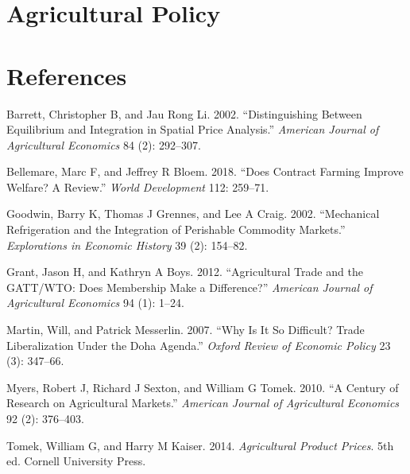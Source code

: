 \documentclass[
]{book}
\begin{document}
\hypertarget{agricultural-policy}{%
\chapter{Agricultural Policy}\label{agricultural-policy}}

\hypertarget{references}{%
\chapter*{References}\label{references}}

\hypertarget{refs}{}
\leavevmode\hypertarget{ref-barrett2002}{}%
Barrett, Christopher B, and Jau Rong Li. 2002. ``Distinguishing Between Equilibrium and Integration in Spatial Price Analysis.'' \emph{American Journal of Agricultural Economics} 84 (2): 292--307.

\leavevmode\hypertarget{ref-bellemare2018}{}%
Bellemare, Marc F, and Jeffrey R Bloem. 2018. ``Does Contract Farming Improve Welfare? A Review.'' \emph{World Development} 112: 259--71.

\leavevmode\hypertarget{ref-goodwin2002}{}%
Goodwin, Barry K, Thomas J Grennes, and Lee A Craig. 2002. ``Mechanical Refrigeration and the Integration of Perishable Commodity Markets.'' \emph{Explorations in Economic History} 39 (2): 154--82.

\leavevmode\hypertarget{ref-grant2012}{}%
Grant, Jason H, and Kathryn A Boys. 2012. ``Agricultural Trade and the GATT/WTO: Does Membership Make a Difference?'' \emph{American Journal of Agricultural Economics} 94 (1): 1--24.

\leavevmode\hypertarget{ref-martin2007}{}%
Martin, Will, and Patrick Messerlin. 2007. ``Why Is It So Difficult? Trade Liberalization Under the Doha Agenda.'' \emph{Oxford Review of Economic Policy} 23 (3): 347--66.

\leavevmode\hypertarget{ref-myers2010}{}%
Myers, Robert J, Richard J Sexton, and William G Tomek. 2010. ``A Century of Research on Agricultural Markets.'' \emph{American Journal of Agricultural Economics} 92 (2): 376--403.

\leavevmode\hypertarget{ref-tomek2014}{}%
Tomek, William G, and Harry M Kaiser. 2014. \emph{Agricultural Product Prices}. 5th ed. Cornell University Press.
\end{document}
